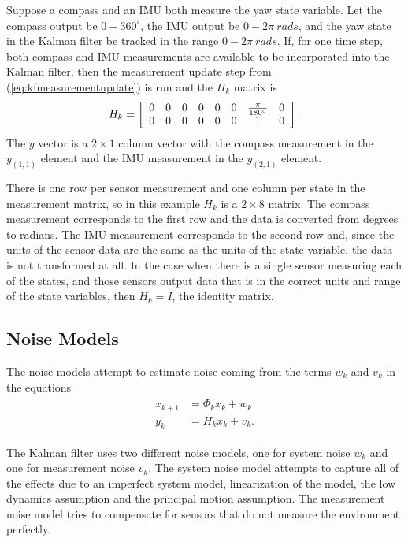 Suppose a compass and an IMU both measure the yaw state variable.
Let the compass output be $0 - 360^\circ$, the IMU output be $0 - 2\pi~rads$, and the yaw state in the Kalman filter be tracked in the range $0 - 2\pi~rads$.
If, for one time step, both compass and IMU measurements are available to be incorporated into the Kalman filter, then the measurement update step from (\ref{eq:kfmeasurementupdate}) is run and the $H_k$ matrix is
\begin{align*}
H_k = \left[\begin{array}{c c c c c c c c}
0 & 0 & 0 & 0 & 0 & 0 & \frac{\pi}{180^\circ} & 0 \\
0 & 0 & 0 & 0 & 0 & 0 & 1 & 0
\end{array}\right].
\end{align*}
The $y$ vector is a $2\times1$ column vector with the compass measurement in the $y_{(1,1)}$ element and the IMU measurement in the $y_{(2,1)}$ element.

There is one row per sensor measurement and one column per state in the measurement matrix, so in this example $H_k$ is a $2\times8$ matrix.
The compass measurement corresponds to the first row and the data is converted from degrees to radians.
The IMU measurement corresponds to the second row and, since the units of the sensor data are the same as the units of the state variable, the data is not transformed at all.
In the case when there is a single sensor measuring each of the states, and those sensors output data that is in the correct units and range of the state variables, then $H_k=I$, the identity matrix.

\subsection{Noise Models}%
\label{sec:kfNoiseModels}
The noise models attempt to estimate noise coming from the terms $w_k$ and $v_k$ in the equations
\begin{align*}
\begin{split}
x_{k+1} &= \Phi_k x_k + w_k \\
y_k &= H_k x_k + v_k.
\end{split}
\end{align*}

The Kalman filter uses two different noise models, one for system noise $w_k$ and one for measurement noise $v_k$.
The system noise model attempts to capture all of the effects due to an imperfect system model, linearization of the model, the low dynamics assumption and the principal motion assumption.
The measurement noise model tries to compensate for sensors that do not measure the environment perfectly.

